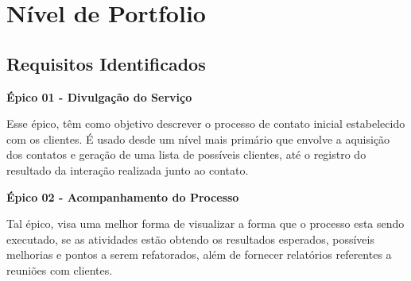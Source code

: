\chapter[Nível de Portfolio]{Nível de Portfolio}

\section{Requisitos Identificados}

\textbf{Épico 01 - Divulgação do Serviço}

Esse épico, têm como objetivo descrever o processo de contato inicial estabelecido com os clientes. É usado desde um nível mais primário que envolve a aquisição dos contatos e geração de uma lista de possíveis clientes, até o registro do resultado da interação realizada junto ao contato.


\textbf{Épico 02 - Acompanhamento do Processo}

Tal épico, visa uma melhor forma de visualizar a forma que o processo esta sendo executado, se as atividades estão obtendo os resultados esperados, possíveis melhorias e pontos a serem refatorados, além de fornecer relatórios referentes a reuniões com clientes.
